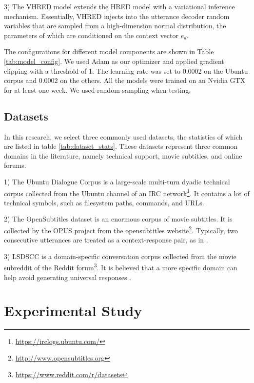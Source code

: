 \documentclass[runningheads]{llncs}
\begin{document}
    3) The VHRED model \cite{VHRED} extends the HRED model with a variational inference mechanism. Essentially, VHRED injects into the utterance decoder random variables that are sampled from a high-dimension normal distribution, the parameters of which are conditioned on the context vector $e_d$.

    The configurations for different model components are shown in Table \ref{tab:model_config}. We used Adam \cite{AdamOpt} as our optimizer and applied gradient clipping with a threshold of 1. The learning rate was set to 0.0002 on the Ubuntu corpus and 0.0002 on the others. All the models were trained on an Nvidia GTX for at least one week. We used random sampling when testing.
    

    \subsection{Datasets}
    In this research, we select three commonly used datasets, the statistics of which are listed in table \ref{tab:dataset_stats}. These datasets represent three common domains in the literature, namely technical support, movie subtitles, and online forums.
    

    1) The Ubuntu Dialogue Corpus \cite{ubuntu_corpus} is a large-scale multi-turn dyadic technical corpus collected from the Ubuntu channel of an IRC network\footnote{\url{https://irclogs.ubuntu.com/}}. It contains a lot of technical symbols, such as filesystem paths, commands, and URLs.

    2) The OpenSubtitles dataset \cite{opensub} is an enormous corpus of movie subtitles. It is collected by the OPUS project \cite{OPUS} from the opensubtitles website\footnote{\url{http://www.opensubtitles.org}}. Typically, two consecutive utterances are treated as a context-response pair, as in \cite{GoogleChatbot,MMI}.

    3) LSDSCC \cite{LSDSCC} is a domain-specific conversation corpus collected from the movie subreddit of the Reddit forum\footnote{\url{https://www.reddit.com/r/datasets}}. It is believed that a more specific domain can help avoid generating universal responses \cite{LSDSCC}.

    \section{Experimental Study}
\end{document}
